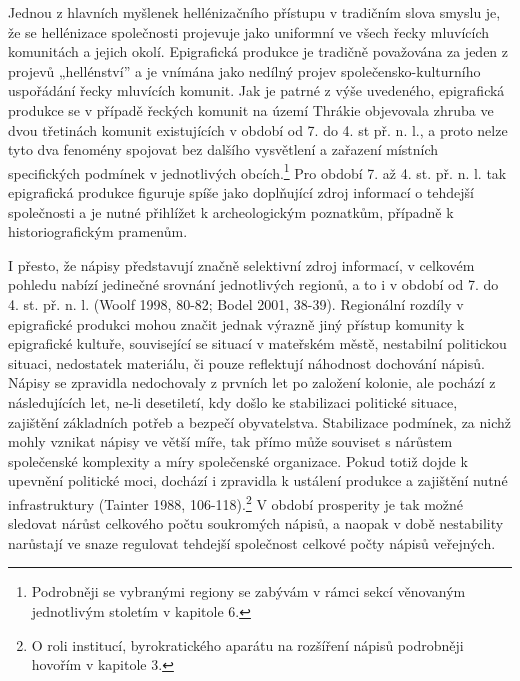 Jednou z hlavních myšlenek hellénizačního přístupu v tradičním slova smyslu je, že se hellénizace společnosti projevuje jako uniformní ve všech řecky mluvících komunitách a jejich okolí. Epigrafická produkce je tradičně považována za jeden z projevů „hellénství” a je vnímána jako nedílný projev společensko-kulturního uspořádání řecky mluvících komunit. Jak je patrné z výše uvedeného, epigrafická produkce se v případě řeckých komunit na území Thrákie objevovala zhruba ve dvou třetinách komunit existujících v období od 7. do 4. st př. n. l., a proto nelze tyto dva fenomény spojovat bez dalšího vysvětlení a zařazení místních specifických podmínek v jednotlivých obcích.\footnote{Podrobněji se vybranými regiony se zabývám v rámci sekcí věnovaným jednotlivým stoletím v kapitole 6.} Pro období 7. až 4. st. př. n. l. tak epigrafická produkce figuruje spíše jako doplňující zdroj informací o tehdejší společnosti a je nutné přihlížet k archeologickým poznatkům, případně k historiografickým pramenům.

I přesto, že nápisy představují značně selektivní zdroj informací, v celkovém pohledu nabízí jedinečné srovnání jednotlivých regionů, a to i v období od 7. do 4. st. př. n. l. (Woolf 1998, 80-82; Bodel 2001, 38-39). Regionální rozdíly v epigrafické produkci mohou značit jednak výrazně jiný přístup komunity k epigrafické kultuře, související se situací v mateřském městě, nestabilní politickou situaci, nedostatek materiálu, či pouze reflektují náhodnost dochování nápisů. Nápisy se zpravidla nedochovaly z prvních let po založení kolonie, ale pochází z následujících let, ne-li desetiletí, kdy došlo ke stabilizaci politické situace, zajištění základních potřeb a bezpečí obyvatelstva. Stabilizace podmínek, za nichž mohly vznikat nápisy ve větší míře, tak přímo může souviset s nárůstem společenské komplexity a míry společenské organizace. Pokud totiž dojde k upevnění politické moci, dochází i zpravidla k ustálení produkce a zajištění nutné infrastruktury (Tainter 1988, 106-118).\footnote{O roli institucí, byrokratického aparátu na rozšíření nápisů podrobněji hovořím v kapitole 3.} V období prosperity je tak možné sledovat nárůst celkového počtu soukromých nápisů, a naopak v době nestability narůstají ve snaze regulovat tehdejší společnost celkové počty nápisů veřejných.

